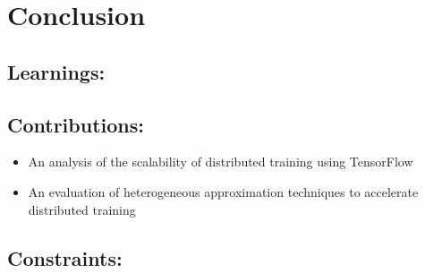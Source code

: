 \section{Conclusion}
\subsection{Learnings:}
\subsection{Contributions:}
\begin{itemize}
\item An analysis of the scalability of distributed training using TensorFlow
\item An evaluation of heterogeneous approximation techniques to accelerate distributed training
\end{itemize}
\subsection{Constraints:}
